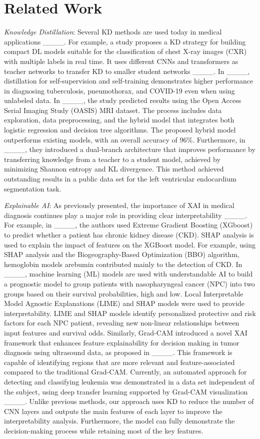 \section{Related Work}
\label{sec:2}
\textit{Knowledge Distillation}: Several KD methods are used today in medical applications ____. For example, a study proposes a KD strategy for building compact DL models suitable for the classification of chest X-ray images (CXR) with multiple labels in real time. It uses different CNNs and transformers as teacher networks to transfer KD to smaller student networks ____. In ____, distillation for self-supervision and self-training demonstrates higher performance in diagnosing tuberculosis, pneumothorax, and COVID-19 even when using unlabeled data. In ____, the study predicted results using the Open Access Serial Imaging Study (OASIS) MRI dataset. 
The process includes data exploration, data preprocessing, and the hybrid model that integrates both logistic regression and decision tree algorithms. The proposed hybrid model outperforms existing models, with an overall accuracy of 96\%. Furthermore, in ____, 
they introduced a dual-branch architecture that improves performance by transferring knowledge from a teacher to a student model, achieved by minimizing Shannon entropy and KL divergence. This method achieved outstanding results in a public data set for the left ventricular endocardium segmentation task.

\noindent\textit{Explainable AI}: As previously presented, the importance of XAI in medical diagnosis continues play a major role in providing clear interpretability ____. For example, in ____, the authors used Extreme Gradient Boosting (XGboost) to predict whether a patient has chronic kidney disease (CKD). SHAP analysis is used to explain the impact of features on the XGBoost model. For example, using SHAP analysis and the Biogeography-Based Optimization (BBO) algorithm, hemoglobin models arebumin contributed mainly to the detection of CKD. In ____, machine learning (ML) models are used with understandable AI to build a prognostic model to group patients with nasopharyngeal cancer (NPC) into two groups based on their survival probabilities, high and low. Local Interpretable Model Agnostic Explanations (LIME) and SHAP models were used to provide interpretability. LIME and SHAP models identify personalized protective and risk factors for each NPC patient, revealing new non-linear relationships between input features and survival odds. Similarly, Grad-CAM introduced a novel XAI framework that enhances feature explainability for decision making in tumor diagnosis using ultrasound data, as proposed in ____. This framework is capable of identifying regions that are more relevant and feature-associated compared to the traditional Grad-CAM. Currently, an automated approach for detecting and classifying leukemia was demonstrated in a data set independent of the subject, using deep transfer learning supported by Grad-CAM visualization ____. Unlike previous methods, our approach uses KD to reduce the number of CNN layers and outputs the main features of each layer to improve the interpretability analysis. Furthermore, the model can fully demonstrate the decision-making process while retaining most of the key features.